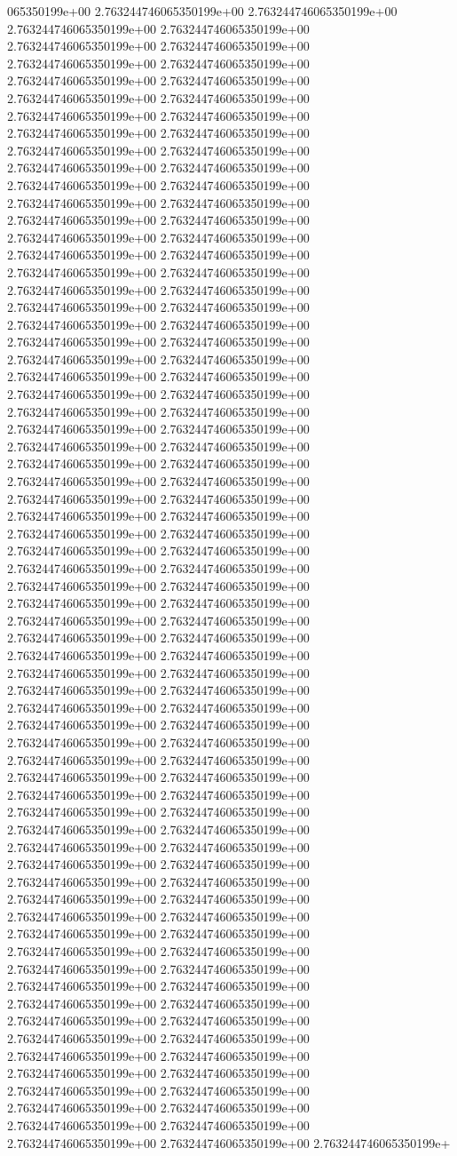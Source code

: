 065350199e+00	2.763244746065350199e+00	2.763244746065350199e+00	2.763244746065350199e+00	2.763244746065350199e+00	2.763244746065350199e+00	2.763244746065350199e+00	2.763244746065350199e+00	2.763244746065350199e+00	2.763244746065350199e+00	2.763244746065350199e+00	2.763244746065350199e+00	2.763244746065350199e+00	2.763244746065350199e+00	2.763244746065350199e+00	2.763244746065350199e+00	2.763244746065350199e+00	2.763244746065350199e+00	2.763244746065350199e+00	2.763244746065350199e+00	2.763244746065350199e+00	2.763244746065350199e+00	2.763244746065350199e+00	2.763244746065350199e+00	2.763244746065350199e+00	2.763244746065350199e+00	2.763244746065350199e+00	2.763244746065350199e+00	2.763244746065350199e+00	2.763244746065350199e+00	2.763244746065350199e+00	2.763244746065350199e+00	2.763244746065350199e+00	2.763244746065350199e+00	2.763244746065350199e+00	2.763244746065350199e+00	2.763244746065350199e+00	2.763244746065350199e+00	2.763244746065350199e+00	2.763244746065350199e+00	2.763244746065350199e+00	2.763244746065350199e+00	2.763244746065350199e+00	2.763244746065350199e+00	2.763244746065350199e+00	2.763244746065350199e+00	2.763244746065350199e+00	2.763244746065350199e+00	2.763244746065350199e+00	2.763244746065350199e+00	2.763244746065350199e+00	2.763244746065350199e+00	2.763244746065350199e+00	2.763244746065350199e+00	2.763244746065350199e+00	2.763244746065350199e+00	2.763244746065350199e+00	2.763244746065350199e+00	2.763244746065350199e+00	2.763244746065350199e+00	2.763244746065350199e+00	2.763244746065350199e+00	2.763244746065350199e+00	2.763244746065350199e+00	2.763244746065350199e+00	2.763244746065350199e+00	2.763244746065350199e+00	2.763244746065350199e+00	2.763244746065350199e+00	2.763244746065350199e+00	2.763244746065350199e+00	2.763244746065350199e+00	2.763244746065350199e+00	2.763244746065350199e+00	2.763244746065350199e+00	2.763244746065350199e+00	2.763244746065350199e+00	2.763244746065350199e+00	2.763244746065350199e+00	2.763244746065350199e+00	2.763244746065350199e+00	2.763244746065350199e+00	2.763244746065350199e+00	2.763244746065350199e+00	2.763244746065350199e+00	2.763244746065350199e+00	2.763244746065350199e+00	2.763244746065350199e+00	2.763244746065350199e+00	2.763244746065350199e+00	2.763244746065350199e+00	2.763244746065350199e+00	2.763244746065350199e+00	2.763244746065350199e+00	2.763244746065350199e+00	2.763244746065350199e+00	2.763244746065350199e+00	2.763244746065350199e+00	2.763244746065350199e+00	2.763244746065350199e+00	2.763244746065350199e+00	2.763244746065350199e+00	2.763244746065350199e+00	2.763244746065350199e+00	2.763244746065350199e+00	2.763244746065350199e+00	2.763244746065350199e+00	2.763244746065350199e+00	2.763244746065350199e+00	2.763244746065350199e+00	2.763244746065350199e+00	2.763244746065350199e+00	2.763244746065350199e+00	2.763244746065350199e+00	2.763244746065350199e+00	2.763244746065350199e+00	2.763244746065350199e+00	2.763244746065350199e+00	2.763244746065350199e+00	2.763244746065350199e+00	2.763244746065350199e+00	2.763244746065350199e+00	2.763244746065350199e+00	2.763244746065350199e+00	2.763244746065350199e+00	2.763244746065350199e+00	2.763244746065350199e+00	2.763244746065350199e+00	2.763244746065350199e+00	2.763244746065350199e+00	2.763244746065350199e+00	2.763244746065350199e+00	2.763244746065350199e+00	2.763244746065350199e+